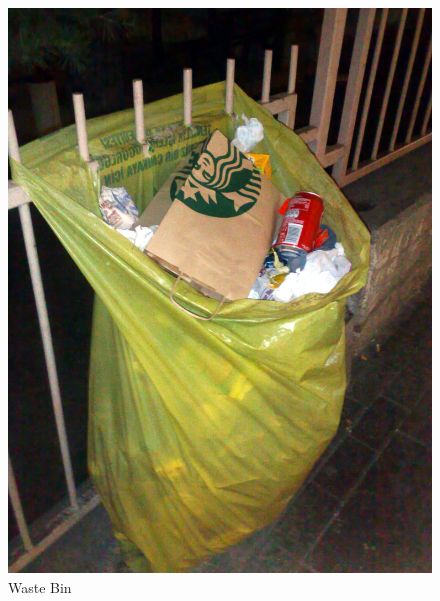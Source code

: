 \begin{figure}[!tbp]
  \centering
  \begin{minipage}[b]{0.48\textwidth}
    \includegraphics[width=\textwidth]{project_graphics/collected_from.jpg}
    \caption{Waste Bin}
    \label{fig:WasteBin}
  \end{minipage}
  \hfill
  \begin{minipage}[b]{0.48\textwidth}

\end{minipage}
\end{figure}
